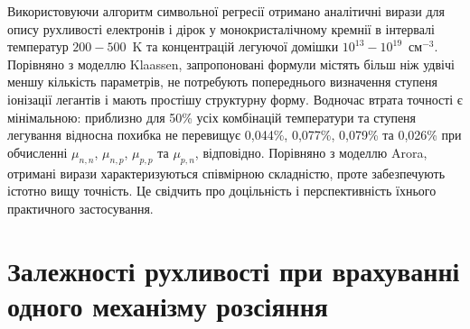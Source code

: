\documentclass[fleqn,twoside,twocolumn,nofootinbib,showkeys]{revtex4} %
\begin{document}
Використовуючи алгоритм символьної регресії отримано аналітичні вирази
для опису рухливості електронів і дірок у монокристалічному кремнії в інтервалі температур $200-500$~K
та концентрацій легуючої домішки $10^{13}-10^{19}$~см$^{-3}$.
Порівняно з моделлю Klaassen, запропоновані формули містять більш ніж удвічі меншу кількість параметрів,
не потребують попереднього визначення ступеня іонізації легантів і мають простішу структурну форму.
Водночас втрата точності є мінімальною:
приблизно для 50\% усіх комбінацій температури та ступеня легування
відносна похибка не перевищує  0,044\%, 0,077\%, 0,079\% та 0,026\% при обчисленні
$\mu_{n,n}$, $\mu_{n,p}$, $\mu_{p,p}$ та $\mu_{p,n}$, відповідно.
Порівняно з моделлю Arora, отримані вирази характеризуються співмірною складністю,
проте забезпечують істотно вищу точність.
Це свідчить про доцільність і перспективність їхнього практичного застосування.

\appendix


\renewcommand{\thetable}{\thesection\arabic{table}}

\section{Залежності рухливості при врахуванні одного механізму розсіяння}\label{App1}
\end{document}
